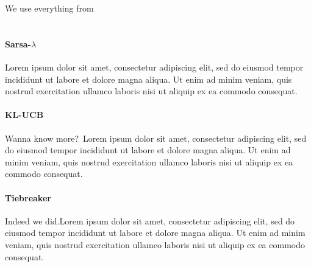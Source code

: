 We use everything from~\cite{Sutton:1998:IRL:551283}
\section{}
\paragraph{Sarsa-$\lambda$}
Lorem ipsum dolor sit amet, consectetur adipiscing elit, sed do eiusmod tempor
incididunt ut labore et dolore magna aliqua. Ut enim ad minim veniam, quis
nostrud exercitation ullamco laboris nisi ut aliquip ex ea commodo consequat. 

\paragraph{KL-UCB}
Wanna know more?~\cite{DBLP:journals/jmlr/GarivierC11}Lorem ipsum dolor sit
amet, consectetur adipiscing elit, sed do eiusmod tempor incididunt ut labore et
dolore magna aliqua. Ut enim ad minim veniam, quis nostrud exercitation ullamco
laboris nisi ut aliquip ex ea commodo consequat. 

\paragraph{Tiebreaker}
Indeed we did.Lorem ipsum dolor sit amet, consectetur adipiscing elit, sed do
eiusmod tempor incididunt ut labore et dolore magna aliqua. Ut enim ad minim
veniam, quis nostrud exercitation ullamco laboris nisi ut aliquip ex ea commodo
consequat. 

